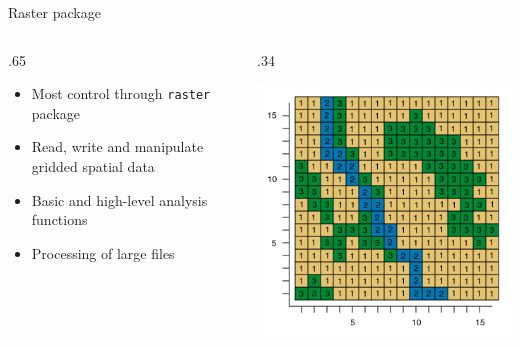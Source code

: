 \documentclass[10pt,ignorenonframetext,]{beamer}
\providecommand{\tightlist}{%
  \setlength{\itemsep}{0pt}\setlength{\parskip}{0pt}}
\def\begincols{\begin{columns}}
\def\begincol{\begin{column}}
\def\endcol{\end{column}}
\def\endcols{\end{columns}}
\begin{document}
\begin{frame}[fragile]{Raster package}

\begincols
\begincol{.65\textwidth}

\begin{itemize}
\tightlist
\item
  Most control through \texttt{raster} package
\item
  Read, write and manipulate gridded spatial data
\item
  Basic and high-level analysis functions
\item
  Processing of large files
\end{itemize}

\endcol
\begincol{.34\textwidth}

\begin{center}\includegraphics[width=1\linewidth]{../images/Raster} \end{center}

\endcol
\endcols

\end{frame}
\end{document}
